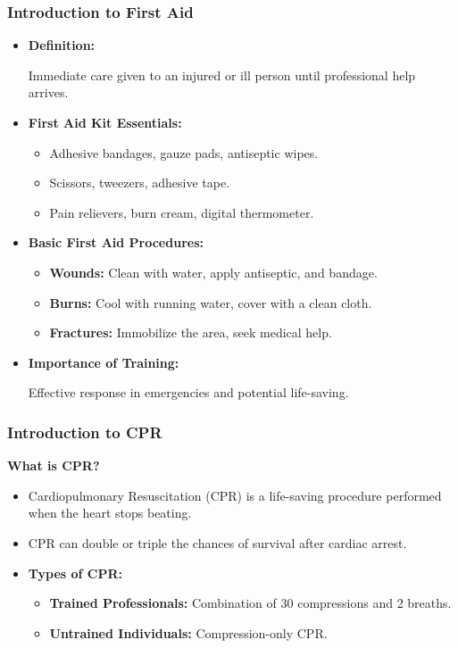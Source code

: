 \begin{frame}[fragile]\frametitle{Introduction to First Aid}

      \begin{itemize}
        \item \textbf{Definition:} 
        
        Immediate care given to an injured or ill person until professional help arrives.
        
        \item \textbf{First Aid Kit Essentials:} 
        \begin{itemize}
            \item Adhesive bandages, gauze pads, antiseptic wipes.
            \item Scissors, tweezers, adhesive tape.
            \item Pain relievers, burn cream, digital thermometer.
        \end{itemize}
        \item \textbf{Basic First Aid Procedures:} 
        \begin{itemize}
            \item \textbf{Wounds:} Clean with water, apply antiseptic, and bandage.
            \item \textbf{Burns:} Cool with running water, cover with a clean cloth.
            \item \textbf{Fractures:} Immobilize the area, seek medical help.
        \end{itemize}
        \item \textbf{Importance of Training:} 
        
        Effective response in emergencies and potential life-saving.
        
      \end{itemize}

\end{frame}

\begin{frame}[fragile]\frametitle{Introduction to CPR}
    \textbf{What is CPR?}
    \begin{itemize}
        \item Cardiopulmonary Resuscitation (CPR) is a life-saving procedure performed when the heart stops beating.
        \item CPR can double or triple the chances of survival after cardiac arrest.
        \item \textbf{Types of CPR:}
        \begin{itemize}
            \item \textbf{Trained Professionals:} Combination of 30 compressions and 2 breaths.
            \item \textbf{Untrained Individuals:} Compression-only CPR.
        \end{itemize}
    \end{itemize}
\end{frame}

